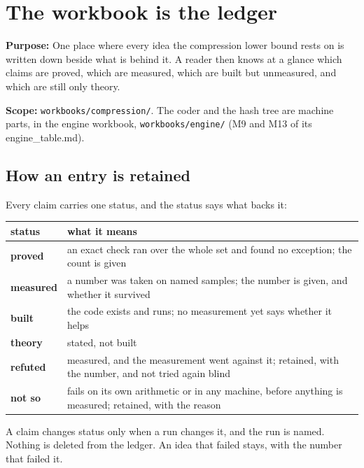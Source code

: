 \chapter{\texorpdfstring{The workbook is the ledger}{The workbook is the ledger}}
\label{chap:readme}

\textbf{Purpose:} One place where every idea the compression lower bound rests on is written down beside what is behind it. A reader then knows at a glance which claims are proved, which are measured, which are built but unmeasured, and which are still only theory.

\textbf{Scope:} \texttt{workbooks/\allowbreak{}compression/\allowbreak{}}. The coder and the hash tree are machine parts, in the engine workbook, \texttt{workbooks/\allowbreak{}engine/\allowbreak{}} (M9 and M13 of its engine\_\allowbreak{}table.md).

\section{\texorpdfstring{How an entry is retained}{How an entry is retained}}

Every claim carries one status, and the status says what backs it:

{\small
\setlength{\tabcolsep}{6pt}
\begin{longtable}{>{\RaggedRight\arraybackslash}p{}>{\RaggedRight\arraybackslash}p{}}
\toprule
status & what it means \\
\midrule
\endhead
\textbf{proved} & an exact check ran over the whole set and found no exception; the count is given \\
\textbf{measured} & a number was taken on named samples; the number is given, and whether it survived \\
\textbf{built} & the code exists and runs; no measurement yet says whether it helps \\
\textbf{theory} & stated, not built \\
\textbf{refuted} & measured, and the measurement went against it; retained, with the number, and not tried again blind \\
\textbf{not so} & fails on its own arithmetic or in any machine, before anything is measured; retained, with the reason \\
\bottomrule
\end{longtable}
}

A claim changes status only when a run changes it, and the run is named. Nothing is deleted from the ledger. An idea that failed stays, with the number that failed it.

